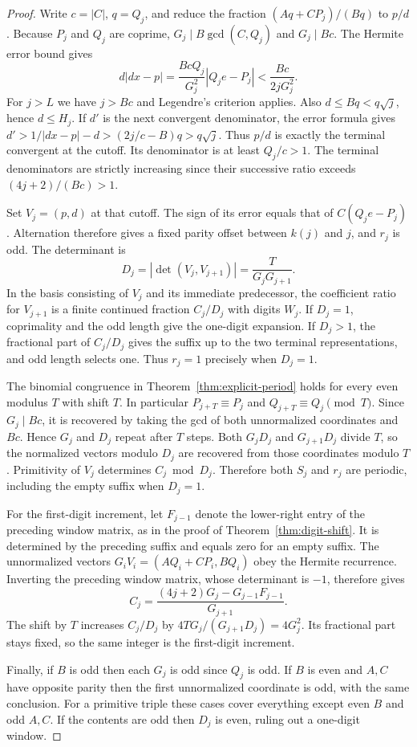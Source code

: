 \documentclass[11pt]{amsart}
\theoremstyle{definition}
\theoremstyle{remark}
\numberwithin{equation}{section}
\begin{document}
\begin{proof}
Write $c=|C|$, $q=Q_j$, and reduce the fraction
$(Aq+CP_j)/(Bq)$ to $p/d$. Because $P_j$ and $Q_j$ are coprime,
$G_j\mid B\gcd(C,Q_j)$ and $G_j\mid Bc$. The Hermite error bound gives
\[
 d|dx-p|=\frac{Bc Q_j}{G_j^2}|Q_j e-P_j|
            <\frac{Bc}{2jG_j^2}.
\]
For $j>L$ we have $j>Bc$ and Legendre's criterion applies.
Also $d\le Bq<q\sqrt j$, hence $d\le H_j$. If $d'$ is the next
convergent denominator, the error formula gives
$d'>1/|dx-p|-d>(2j/c-B)q>q\sqrt j$. Thus $p/d$ is exactly the
terminal convergent at the cutoff. Its denominator is at least
$Q_j/c>1$. The terminal denominators are strictly increasing since
their successive ratio exceeds $(4j+2)/(Bc)>1$.

Set $V_j=(p,d)$ at that cutoff. The sign of its error equals that of
$C(Q_j e-P_j)$. Alternation therefore gives a fixed parity offset
between $k(j)$ and $j$, and $r_j$ is odd. The determinant is
\[
 D_j=|\det(V_j,V_{j+1})|=\frac{T}{G_jG_{j+1}}.
\]
In the basis consisting of $V_j$ and its immediate predecessor, the
coefficient ratio for $V_{j+1}$ is a finite continued fraction
$C_j/D_j$ with digits $W_j$. If $D_j=1$, coprimality and the odd length
give the one-digit expansion. If $D_j>1$, the fractional part of
$C_j/D_j$ gives the suffix up to the two terminal representations,
and odd length selects one. Thus $r_j=1$ precisely when $D_j=1$.

The binomial congruence in Theorem~\ref{thm:explicit-period} holds
for every even modulus $T$ with shift $T$. In particular
$P_{j+T}\equiv P_j$ and $Q_{j+T}\equiv Q_j\pmod T$.
Since $G_j\mid Bc$, it is recovered by taking the gcd of both
unnormalized coordinates and $Bc$. Hence $G_j$ and $D_j$ repeat
after $T$ steps. Both $G_jD_j$ and $G_{j+1}D_j$ divide $T$, so the
normalized vectors modulo $D_j$ are recovered from those coordinates
modulo $T$. Primitivity of $V_j$ determines $C_j\bmod D_j$.
Therefore both $S_j$ and $r_j$ are periodic, including the empty
suffix when $D_j=1$.

For the first-digit increment, let $F_{j-1}$ denote the lower-right
entry of the preceding window matrix, as in the proof of
Theorem~\ref{thm:digit-shift}. It is determined by the preceding
suffix and equals zero for an empty suffix. The unnormalized
vectors $G_iV_i=(AQ_i+CP_i,BQ_i)$ obey the Hermite recurrence.
Inverting the preceding window matrix, whose determinant is $-1$,
therefore gives
\[
 C_j=\frac{(4j+2)G_j-G_{j-1}F_{j-1}}{G_{j+1}}.
\]
The shift by $T$ increases $C_j/D_j$ by
$4T G_j/(G_{j+1}D_j)=4G_j^2$. Its fractional part stays fixed, so
the same integer is the first-digit increment.

Finally, if $B$ is odd then each $G_j$ is odd since $Q_j$ is odd.
If $B$ is even and $A,C$ have opposite parity then the first
unnormalized coordinate is odd, with the same conclusion.
For a primitive triple these cases cover everything except even $B$
and odd $A,C$. If the contents are odd then $D_j$ is even,
ruling out a one-digit window.
\end{proof}
\end{document}

